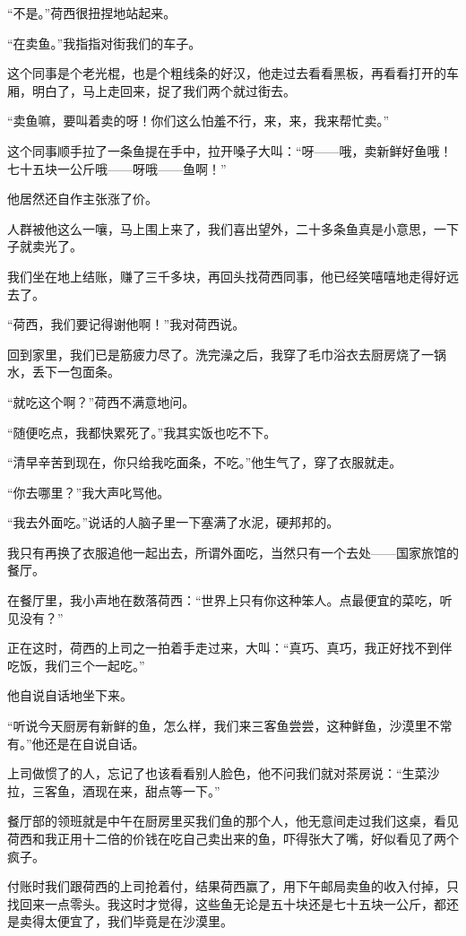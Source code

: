 \par “不是。”荷西很扭捏地站起来。
\par “在卖鱼。”我指指对街我们的车子。
\par 这个同事是个老光棍，也是个粗线条的好汉，他走过去看看黑板，再看看打开的车厢，明白了，马上走回来，捉了我们两个就过街去。
\par “卖鱼嘛，要叫着卖的呀！你们这么怕羞不行，来，来，我来帮忙卖。”
\par 这个同事顺手拉了一条鱼提在手中，拉开嗓子大叫：“呀——哦，卖新鲜好鱼哦！七十五块一公斤哦——呀哦——鱼啊！”
\par 他居然还自作主张涨了价。
\par 人群被他这么一嚷，马上围上来了，我们喜出望外，二十多条鱼真是小意思，一下子就卖光了。
\par 我们坐在地上结账，赚了三千多块，再回头找荷西同事，他已经笑嘻嘻地走得好远去了。
\par “荷西，我们要记得谢他啊！”我对荷西说。
\par 回到家里，我们已是筋疲力尽了。洗完澡之后，我穿了毛巾浴衣去厨房烧了一锅水，丢下一包面条。
\par “就吃这个啊？”荷西不满意地问。
\par “随便吃点，我都快累死了。”我其实饭也吃不下。
\par “清早辛苦到现在，你只给我吃面条，不吃。”他生气了，穿了衣服就走。
\par “你去哪里？”我大声叱骂他。
\par “我去外面吃。”说话的人脑子里一下塞满了水泥，硬邦邦的。
\par 我只有再换了衣服追他一起出去，所谓外面吃，当然只有一个去处——国家旅馆的餐厅。
\par 在餐厅里，我小声地在数落荷西：“世界上只有你这种笨人。点最便宜的菜吃，听见没有？”
\par 正在这时，荷西的上司之一拍着手走过来，大叫：“真巧、真巧，我正好找不到伴吃饭，我们三个一起吃。”
\par 他自说自话地坐下来。
\par “听说今天厨房有新鲜的鱼，怎么样，我们来三客鱼尝尝，这种鲜鱼，沙漠里不常有。”他还是在自说自话。
\par 上司做惯了的人，忘记了也该看看别人脸色，他不问我们就对茶房说：“生菜沙拉，三客鱼，酒现在来，甜点等一下。”
\par 餐厅部的领班就是中午在厨房里买我们鱼的那个人，他无意间走过我们这桌，看见荷西和我正用十二倍的价钱在吃自己卖出来的鱼，吓得张大了嘴，好似看见了两个疯子。
\par 付账时我们跟荷西的上司抢着付，结果荷西赢了，用下午邮局卖鱼的收入付掉，只找回来一点零头。我这时才觉得，这些鱼无论是五十块还是七十五块一公斤，都还是卖得太便宜了，我们毕竟是在沙漠里。
